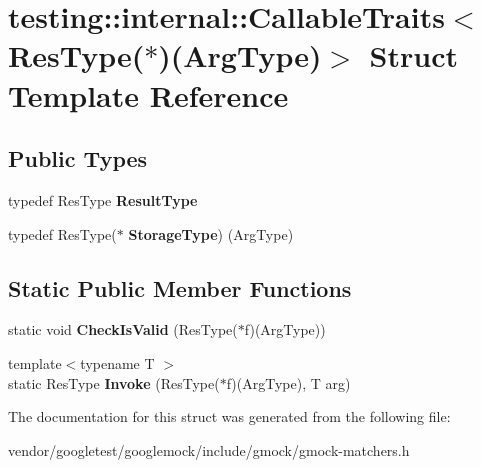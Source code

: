 \hypertarget{structtesting_1_1internal_1_1CallableTraits_3_01ResType_07_5_08_07ArgType_08_4}{}\section{testing\+:\+:internal\+:\+:Callable\+Traits$<$ Res\+Type($\ast$)(Arg\+Type)$>$ Struct Template Reference}
\label{structtesting_1_1internal_1_1CallableTraits_3_01ResType_07_5_08_07ArgType_08_4}
\subsection*{Public Types}
\begin{DoxyCompactItemize}
\item 
typedef Res\+Type {\bfseries Result\+Type}\hypertarget{structtesting_1_1internal_1_1CallableTraits_3_01ResType_07_5_08_07ArgType_08_4_a1959235d286e9c9bb57c1c1139a0cbd8}{}\label{structtesting_1_1internal_1_1CallableTraits_3_01ResType_07_5_08_07ArgType_08_4_a1959235d286e9c9bb57c1c1139a0cbd8}

\item 
typedef Res\+Type($\ast$ {\bfseries Storage\+Type}) (Arg\+Type)\hypertarget{structtesting_1_1internal_1_1CallableTraits_3_01ResType_07_5_08_07ArgType_08_4_a0ee48af3b40e5c5bcb48a78cdacf6d9c}{}\label{structtesting_1_1internal_1_1CallableTraits_3_01ResType_07_5_08_07ArgType_08_4_a0ee48af3b40e5c5bcb48a78cdacf6d9c}

\end{DoxyCompactItemize}
\subsection*{Static Public Member Functions}
\begin{DoxyCompactItemize}
\item 
static void {\bfseries Check\+Is\+Valid} (Res\+Type($\ast$f)(Arg\+Type))\hypertarget{structtesting_1_1internal_1_1CallableTraits_3_01ResType_07_5_08_07ArgType_08_4_a184f502a16b227a2ec16e49bd23b2ded}{}\label{structtesting_1_1internal_1_1CallableTraits_3_01ResType_07_5_08_07ArgType_08_4_a184f502a16b227a2ec16e49bd23b2ded}

\item 
{\footnotesize template$<$typename T $>$ }\\static Res\+Type {\bfseries Invoke} (Res\+Type($\ast$f)(Arg\+Type), T arg)\hypertarget{structtesting_1_1internal_1_1CallableTraits_3_01ResType_07_5_08_07ArgType_08_4_a8a61fc15cde62a0f06b2ee5a0a805c6c}{}\label{structtesting_1_1internal_1_1CallableTraits_3_01ResType_07_5_08_07ArgType_08_4_a8a61fc15cde62a0f06b2ee5a0a805c6c}

\end{DoxyCompactItemize}


The documentation for this struct was generated from the following file\+:\begin{DoxyCompactItemize}
\item 
vendor/googletest/googlemock/include/gmock/gmock-\/matchers.\+h\end{DoxyCompactItemize}
